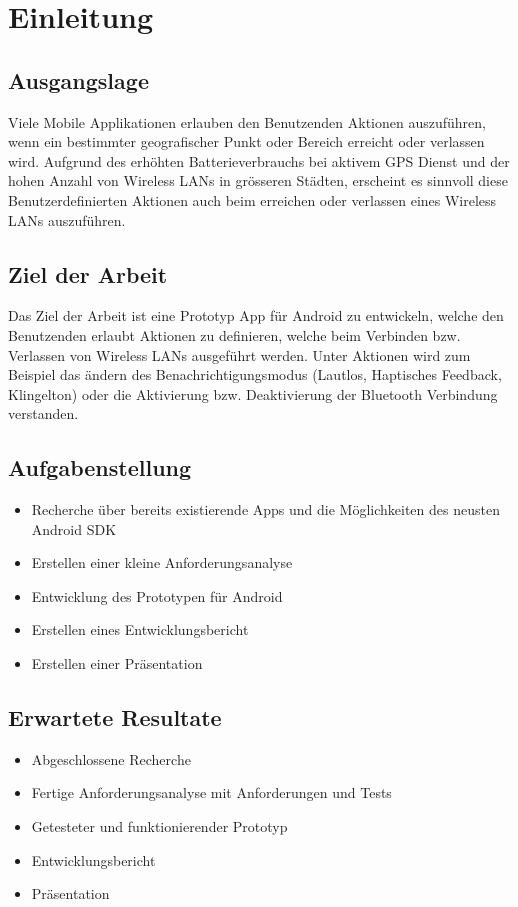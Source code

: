 \chapter{Einleitung}
\label{sec:Einleitung}

\section{Ausgangslage}
\label{sec:Ausgangslage}

Viele Mobile Applikationen erlauben den Benutzenden Aktionen auszuführen, wenn ein bestimmter geografischer Punkt oder Bereich erreicht oder verlassen wird. Aufgrund des erhöhten Batterieverbrauchs bei aktivem GPS Dienst und der hohen Anzahl von Wireless LANs in grösseren Städten, erscheint es sinnvoll diese Benutzerdefinierten Aktionen auch beim erreichen oder verlassen eines Wireless LANs auszuführen.

\section{Ziel der Arbeit}
\label{sec:zielderarbeit}
Das Ziel der Arbeit ist eine Prototyp App für Android zu entwickeln, welche den Benutzenden erlaubt Aktionen zu definieren, welche beim Verbinden bzw. Verlassen von Wireless LANs ausgeführt werden. Unter Aktionen wird zum Beispiel das ändern des Benachrichtigungsmodus (Lautlos, Haptisches Feedback, Klingelton) oder die Aktivierung bzw. Deaktivierung der Bluetooth Verbindung verstanden.

\section{Aufgabenstellung}
\label{sec:aufgabenstellung}
\begin{itemize}
  \item Recherche über bereits existierende Apps und die Möglichkeiten des neusten Android SDK
  \item Erstellen einer kleine Anforderungsanalyse
  \item Entwicklung des Prototypen für Android
  \item Erstellen eines Entwicklungsbericht
  \item Erstellen einer Präsentation
\end{itemize}

\section{Erwartete Resultate}
\label{sec:erwarteteresultate}
\begin{itemize}
  \item Abgeschlossene Recherche
  \item Fertige Anforderungsanalyse mit Anforderungen und Tests
  \item Getesteter und funktionierender Prototyp
  \item Entwicklungsbericht
  \item Präsentation
\end{itemize}